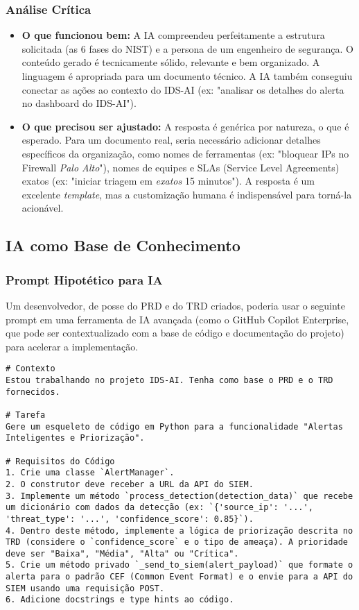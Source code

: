 \documentclass[a4paper,12pt]{article}
\begin{document}
\subsubsection{Análise Crítica}
\begin{itemize}
    \item \textbf{O que funcionou bem:} A IA compreendeu perfeitamente a estrutura solicitada (as 6 fases do NIST) e a persona de um engenheiro de segurança. O conteúdo gerado é tecnicamente sólido, relevante e bem organizado. A linguagem é apropriada para um documento técnico. A IA também conseguiu conectar as ações ao contexto do IDS-AI (ex: "analisar os detalhes do alerta no dashboard do IDS-AI").
    
    \item \textbf{O que precisou ser ajustado:} A resposta é genérica por natureza, o que é esperado. Para um documento real, seria necessário adicionar detalhes específicos da organização, como nomes de ferramentas (ex: "bloquear IPs no Firewall \textit{Palo Alto}"), nomes de equipes e SLAs (Service Level Agreements) exatos (ex: "iniciar triagem em \textit{exatos} 15 minutos"). A resposta é um excelente \textit{template}, mas a customização humana é indispensável para torná-la acionável.
\end{itemize}

\subsection{IA como Base de Conhecimento}

\subsubsection{Prompt Hipotético para IA}
Um desenvolvedor, de posse do PRD e do TRD criados, poderia usar o seguinte prompt em uma ferramenta de IA avançada (como o GitHub Copilot Enterprise, que pode ser contextualizado com a base de código e documentação do projeto) para acelerar a implementação.

\begin{lstlisting}[caption=Prompt Hipotético de Implementação]
# Contexto
Estou trabalhando no projeto IDS-AI. Tenha como base o PRD e o TRD fornecidos.

# Tarefa
Gere um esqueleto de código em Python para a funcionalidade "Alertas Inteligentes e Priorização".

# Requisitos do Código
1. Crie uma classe `AlertManager`.
2. O construtor deve receber a URL da API do SIEM.
3. Implemente um método `process_detection(detection_data)` que recebe um dicionário com dados da detecção (ex: `{'source_ip': '...', 'threat_type': '...', 'confidence_score': 0.85}`).
4. Dentro deste método, implemente a lógica de priorização descrita no TRD (considere o `confidence_score` e o tipo de ameaça). A prioridade deve ser "Baixa", "Média", "Alta" ou "Crítica".
5. Crie um método privado `_send_to_siem(alert_payload)` que formate o alerta para o padrão CEF (Common Event Format) e o envie para a API do SIEM usando uma requisição POST.
6. Adicione docstrings e type hints ao código.
\end{lstlisting}
\end{document}
